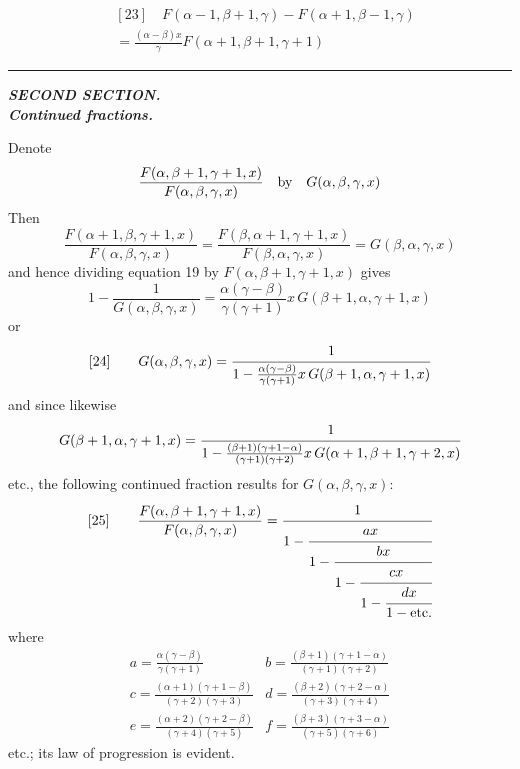 \[
\begin{aligned}&[23]\quad F(\alpha-1,\beta+1,\gamma)-F(\alpha+1,\beta-1,\gamma)\\&{}=\frac{(\alpha-\beta)x}{\gamma}F(\alpha+1,\beta+1,\gamma+1)
\end{aligned}
\]
\begin{center}\rule{.24\linewidth}{.3pt}\end{center}
\par{}\begin{center}\textbf{\textit{SECOND SECTION.}}\\[6pt]\textbf{\textit{Continued fractions.}}\end{center}
Denote
\[
\frac{F(\alpha,\beta+1,\gamma+1,x)}{F(\alpha,\beta,\gamma,x)}\quad\hbox{by}\quad G(\alpha,\beta,\gamma,x)
\]
Then
\[
\frac{F(\alpha+1,\beta,\gamma+1,x)}{F(\alpha,\beta,\gamma,x)}=\frac{F(\beta,\alpha+1,\gamma+1,x)}{F(\beta,\alpha,\gamma,x)}=G(\beta,\alpha,\gamma,x)
\]
and hence dividing equation 19 by $F(\alpha,\beta+1,\gamma+1,x)$ gives
\[
1-\frac{1}{G(\alpha,\beta,\gamma,x)}=\frac{\alpha(\gamma-\beta)}{\gamma(\gamma+1)}x\,G(\beta+1,\alpha,\gamma+1,x)
\]
or
\[
[24]\qquad G(\alpha,\beta,\gamma,x)=\cfrac{1}{1-\frac{\alpha(\gamma-\beta)}{\gamma(\gamma+1)}x\,G(\beta+1,\alpha,\gamma+1,x)}
\]
and since likewise
\[
G(\beta+1,\alpha,\gamma+1,x)=\cfrac{1}{1-\frac{(\beta+1)(\gamma+1-\alpha)}{(\gamma+1)(\gamma+2)}x\,G(\alpha+1,\beta+1,\gamma+2,x)}
\]
etc., the following continued fraction results for $G(\alpha,\beta,\gamma,x)$:
\[
[25]\qquad\frac{F(\alpha,\beta+1,\gamma+1,x)}{F(\alpha,\beta,\gamma,x)}=\cfrac{1}{1-\cfrac{ax}{1-\cfrac{bx}{1-\cfrac{cx}{1-\cfrac{dx}{1-\hbox{etc.}}}}}}
\]
where
\[
\begin{array}{ll}
a=\frac{\alpha(\gamma-\beta)}{\gamma(\gamma+1)}&b=\frac{(\beta+1)(\gamma+1-\alpha)}{(\gamma+1)(\gamma+2)}\\[6pt]
c=\frac{(\alpha+1)(\gamma+1-\beta)}{(\gamma+2)(\gamma+3)}&d=\frac{(\beta+2)(\gamma+2-\alpha)}{(\gamma+3)(\gamma+4)}\\[6pt]
e=\frac{(\alpha+2)(\gamma+2-\beta)}{(\gamma+4)(\gamma+5)}&f=\frac{(\beta+3)(\gamma+3-\alpha)}{(\gamma+5)(\gamma+6)}
\end{array}
\]
etc.; its law of progression is evident.

